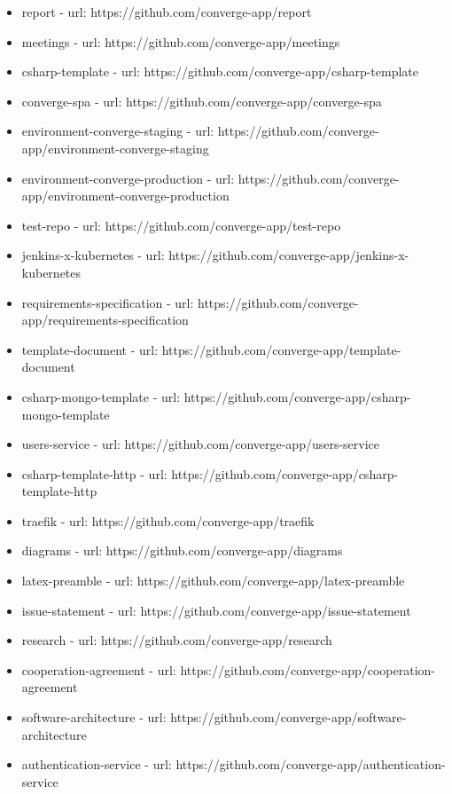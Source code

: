 \begin{itemize}
  \item report - url: https://github.com/converge-app/report
  \item meetings - url: https://github.com/converge-app/meetings
  \item csharp-template - url: https://github.com/converge-app/csharp-template
  \item converge-spa - url: https://github.com/converge-app/converge-spa
  \item environment-converge-staging - url: https://github.com/converge-app/environment-converge-staging
  \item environment-converge-production - url: https://github.com/converge-app/environment-converge-production
  \item test-repo - url: https://github.com/converge-app/test-repo
  \item jenkins-x-kubernetes - url: https://github.com/converge-app/jenkins-x-kubernetes
  \item requirements-specification - url: https://github.com/converge-app/requirements-specification
  \item template-document - url: https://github.com/converge-app/template-document
  \item csharp-mongo-template - url: https://github.com/converge-app/csharp-mongo-template
  \item users-service - url: https://github.com/converge-app/users-service
  \item csharp-template-http - url: https://github.com/converge-app/csharp-template-http
  \item traefik - url: https://github.com/converge-app/traefik
  \item diagrams - url: https://github.com/converge-app/diagrams
  \item latex-preamble - url: https://github.com/converge-app/latex-preamble
  \item issue-statement - url: https://github.com/converge-app/issue-statement
  \item research - url: https://github.com/converge-app/research
  \item cooperation-agreement - url: https://github.com/converge-app/cooperation-agreement
  \item software-architecture - url: https://github.com/converge-app/software-architecture
  \item authentication-service - url: https://github.com/converge-app/authentication-service

\end{itemize}

